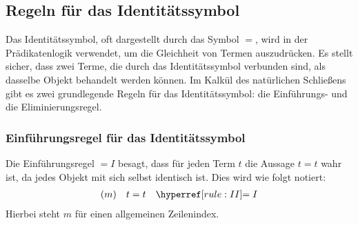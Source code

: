 \documentclass[main.tex]{subfiles}
\begin{document}
\subsection{Regeln für das Identitätssymbol}


Das Identitätssymbol, oft dargestellt durch das Symbol \(=\), wird in der Prädikatenlogik verwendet, um die Gleichheit von Termen auszudrücken. Es stellt sicher, dass zwei Terme, die durch das Identitätssymbol verbunden sind, als dasselbe Objekt behandelt werden können. Im Kalkül des natürlichen Schließens gibt es zwei grundlegende Regeln für das Identitätssymbol: die Einführungs- und die Eliminierungsregel.

\subsubsection{Einführungsregel für das Identitätssymbol}
\label{rule:II} 
\begin{definition}
Die Einführungsregel \(=I\) besagt, dass für jeden Term \(t\) die Aussage \(t = t\) wahr ist, da jedes Objekt mit sich selbst identisch ist. Dies wird wie folgt notiert:
\[
\begin{array}{lll}
    (m) & t = t & \rII \\
\end{array}
\]
Hierbei steht \(m\) für einen allgemeinen Zeilenindex.
\end{definition}
\end{document}
